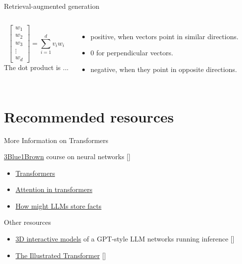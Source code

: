 \documentclass[10pt]{beamer}
\newcommand{\citeme}[1]{{\xspace\color{scAqua} \scriptsize [\cite{#1}]}}
\begin{document}
\begin{frame}{Retrieval-augmented generation}
\begin{columns}[T,onlytextwidth]
$$\begin{bmatrix}
			w_1 \\
			w_2 \\
			w_3 \\
			\vdots \\
			w_d
		\end{bmatrix}
	    = \sum_{i=1}^{d} v_i w_i
		$$
		\vspace{0.1cm}
		The dot product is ...
				\begin{itemize}
			\item positive, when vectors point in similar directions. 
			\item 0 for perpendicular vectors.
			\item negative, when they point in opposite directions.
		\end{itemize}
	\end{columns}
\end{frame}





\appendix

\section{Recommended resources}

\begin{frame}{More Information on Transformers}
	\begin{block}{\href{https://www.youtube.com/playlist?list=PLZHQObOWTQDNU6R1_67000Dx_ZCJB-3pi}{3Blue1Brown} course on neural networks\citeme{Sanderson2024}}
	\begin{itemize}
		\item \href{https://www.youtube.com/watch?v=wjZofJX0v4M&list=PLZHQObOWTQDNU6R1_67000Dx_ZCJB-3pi&index=6}{Transformers}
		\item \href{https://www.youtube.com/watch?v=eMlx5fFNoYc&list=PLZHQObOWTQDNU6R1_67000Dx_ZCJB-3pi&index=7}{Attention in transformers}
		\item \href{https://www.youtube.com/watch?v=9-Jl0dxWQs8&list=PLZHQObOWTQDNU6R1_67000Dx_ZCJB-3pi&index=8}{How might LLMs store facts}
	\end{itemize}
\end{block}
	\begin{block}{Other resources}
	\begin{itemize}
		\item \href{https://bbycroft.net/llm}{3D interactive models} of a GPT-style LLM networks running inference\citeme{Bycroft2023}
		\item \href{http://jalammar.github.io/illustrated-transformer/}{The Illustrated Transformer}\citeme{Alammar2018}
	\end{itemize}
	\end{block}
\end{frame}
\end{document}
